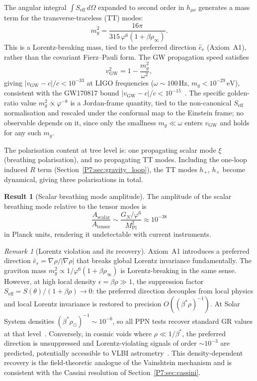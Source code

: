 \documentclass[11pt,a4paper]{article}
\theoremstyle{definition}
\newtheorem{result}[theorem]{Result}
\theoremstyle{remark}
\newtheorem{remark}[theorem]{Remark}
\newcommand{\vp}{\varphi}
\newcommand{\bst}{\beta^{*}}
\newcommand{\MPl}{M_{\mathrm{Pl}}}
\begin{document}
The angular integral $\int S_{\mathrm{eff}}\,d\Omega$ expanded to second
order in $h_{\mu\nu}$ generates a mass term for the transverse-traceless
(TT) modes:
\begin{equation}
  m_g^2 = \frac{16\pi}{315\,\vp^6(1+\beta\rho_\infty)}.
  \label{P7:eq:graviton_mass}
\end{equation}
This is a Lorentz-breaking mass, tied to the preferred direction
$\hat{e}_r$ (Axiom~A1), rather than the covariant Fierz--Pauli form.
The GW propagation speed satisfies
\begin{equation}
  v_{\mathrm{GW}}^2 = 1 - \frac{m_g^2}{\omega^2},
\end{equation}
giving $|v_{\mathrm{GW}}-c|/c < 10^{-33}$ at LIGO frequencies
($\omega\sim100\,\mathrm{Hz}$, $m_g < 10^{-29}\,\mathrm{eV}$), consistent
with the GW170817 bound $|v_{\mathrm{GW}}-c|/c < 10^{-15}$~\cite{LIGO_GW170817}.
The specific golden-ratio value $m_g^2\propto\vp^{-8}$ is a Jordan-frame
quantity, tied to the non-canonical $S_{\mathrm{eff}}$ normalisation and
rescaled under the conformal map to the Einstein frame; no observable
depends on it, since only the smallness $m_g\ll\omega$ enters $v_{\mathrm{GW}}$
and holds for any such $m_g$.

The polarisation content at tree level is: one propagating scalar mode
$\xi$ (breathing polarisation), and no propagating TT modes.
Including the one-loop induced $R$ term (Section~\ref{P7:sec:gravity_loop}),
the TT modes $h_+$, $h_\times$ become dynamical, giving three polarisations
in total.

\begin{result}[Scalar breathing mode amplitude]
The amplitude of the scalar breathing mode relative to the tensor modes is
\begin{equation}
  \frac{A_{\mathrm{scalar}}}{A_{\mathrm{tensor}}}
  \sim \frac{G_N/\vp^6}{\MPl^2}
  \approx 10^{-38}
\end{equation}
in Planck units, rendering it undetectable with current instruments.
\end{result}

\begin{remark}[Lorentz violation and its recovery]
\label{P7:rem:lorentz}
Axiom~A1 introduces a preferred direction $\hat{e}_r = \nabla\rho/|\nabla\rho|$
that breaks global Lorentz invariance fundamentally.  The graviton mass
$m_g^2\propto1/\vp^6(1+\beta\rho_\infty)$ is Lorentz-breaking in the same
sense.  However, at high local density $\epsilon=\beta\rho\gg1$, the
suppression factor $S_{\mathrm{eff}}=S(\theta)/(1+\beta\rho)\to0$:
the preferred direction decouples from local physics and local Lorentz
invariance is restored to precision $O((\bst\rho)^{-1})$.
At Solar System densities $(\bst\rho_\odot)^{-1}\sim10^{-6}$, so all
PPN tests recover standard GR values at that level~\cite{Paper1}.
Conversely, in cosmic voids where $\rho\ll1/\bst$, the preferred
direction is unsuppressed and Lorentz-violating signals of order
$\sim10^{-3}$ are predicted, potentially accessible to VLBI
astrometry~\cite{Paper1}.  This density-dependent recovery is the
field-theoretic analogue of the Vainshtein mechanism and is consistent
with the Cassini resolution of Section~\ref{P7:sec:cassini}.
\end{remark}
\end{document}
